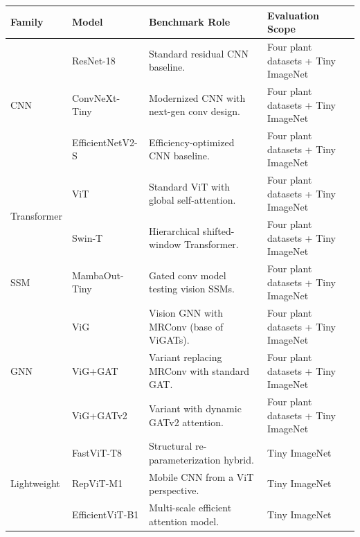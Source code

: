 \documentclass[]{interact}
\theoremstyle{plain}
\theoremstyle{definition}
\theoremstyle{remark}
\begin{document}
\begin{table}[H]
\small
\setlength{\tabcolsep}{3.0pt}
\renewcommand{\arraystretch}{1.15}
{\begin{tabular}{@{}p{1.55cm}p{4.70cm}p{5.55cm}p{2.65cm}@{}} \toprule
\textbf{Family} & \textbf{Model} & \textbf{Benchmark Role} & \textbf{Evaluation Scope} \\ \midrule
\multirow{3}{*}{CNN}
 & ResNet-18 \citep{he2016deep} & Standard residual CNN baseline. & Four plant datasets + Tiny ImageNet \\
 & ConvNeXt-Tiny \citep{liu2022convnext} & Modernized CNN with next-gen conv design. & Four plant datasets + Tiny ImageNet \\
 & EfficientNetV2-S \citep{tan2021efficientnetv2} & Efficiency-optimized CNN baseline. & Four plant datasets + Tiny ImageNet \\ \midrule
\multirow{2}{*}{Transformer}
 & ViT \citep{dosovitskiy2020image} & Standard ViT with global self-attention. & Four plant datasets + Tiny ImageNet \\
 & Swin-T \citep{liu2021swin} & Hierarchical shifted-window Transformer. & Four plant datasets + Tiny ImageNet \\ \midrule
SSM
 & MambaOut-Tiny \citep{yu2024mambaout} & Gated conv model testing vision SSMs. & Four plant datasets + Tiny ImageNet \\ \midrule
\multirow{3}{*}{GNN}
 & ViG \citep{han2022vision} & Vision GNN with MRConv (base of ViGATs). & Four plant datasets + Tiny ImageNet \\
 & ViG+GAT \citep{velickovic2018graph} & Variant replacing MRConv with standard GAT. & Four plant datasets + Tiny ImageNet \\
 & ViG+GATv2 \citep{brody2022gat} & Variant with dynamic GATv2 attention. & Four plant datasets + Tiny ImageNet \\ \midrule
\multirow{3}{*}{Lightweight}
 & FastViT-T8 \citep{vasu2023fastvit} & Structural re-parameterization hybrid. & Tiny ImageNet \\
 & RepViT-M1 \citep{wang2024repvit} & Mobile CNN from a ViT perspective. & Tiny ImageNet \\
 & EfficientViT-B1 \citep{cai2023efficientvit} & Multi-scale efficient attention model. & Tiny ImageNet \\ \bottomrule
\end{tabular}}
\label{tab:benchmark_models}
\end{table}
\end{document}

